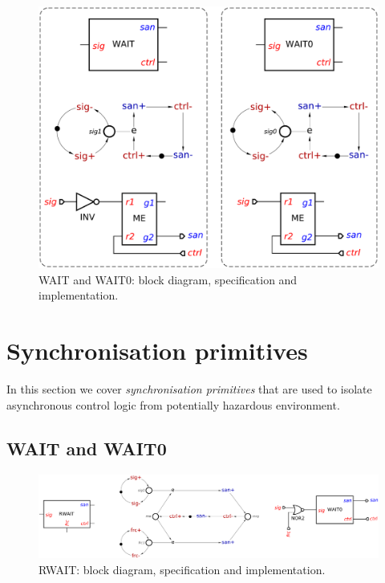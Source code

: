 \documentclass[conference]{IEEEtran}
\begin{document}
\begin{figure}
\begin{center}
    \includegraphics[scale=0.23]{fig/WAIT.pdf}
    \caption{\textsf{WAIT} and \textsf{WAIT0}: block diagram,
    specification and implementation.}
    \label{fig:wait}
\end{center}
\end{figure}

\section{Synchronisation primitives}\label{sec-sync}

In this section we cover \emph{synchronisation primitives} that are used to
isolate asynchronous control logic from potentially hazardous environment.

\subsection{\textsf{WAIT} and \textsf{WAIT0}}

\begin{figure}
\begin{center}
    \includegraphics[scale=0.23]{fig/RWAIT.pdf}
    \caption{\textsf{RWAIT}: block diagram, specification and implementation.}
    \label{fig:rwait}
\end{center}
\end{figure}
\end{document}
